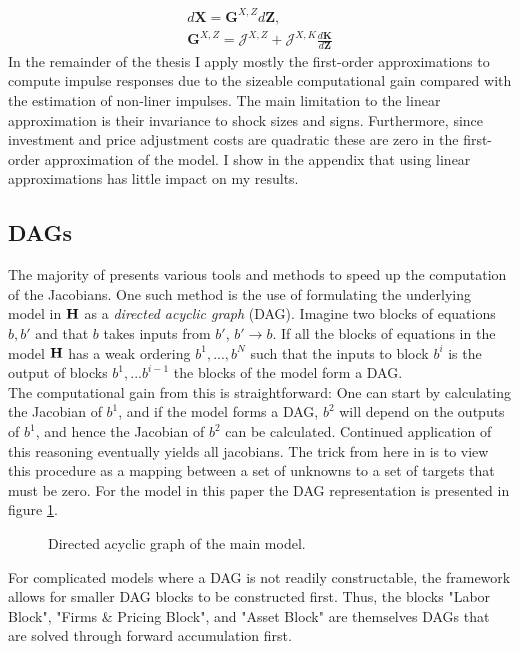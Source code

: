 \begin{gather*}
d\boldsymbol{X}=\boldsymbol{G}^{X,Z}d\boldsymbol{Z}, \\
\boldsymbol{G}^{X,Z}=\mathcal{J}^{X,Z}+\mathcal{J}^{X,K}\frac{d\boldsymbol{K}}{d\boldsymbol{Z}}
\end{gather*}
In the remainder of the thesis I apply mostly the first-order approximations to compute impulse responses due to the sizeable computational gain compared with the estimation of non-liner impulses. The main limitation to the linear approximation is their invariance to shock sizes and signs. Furthermore, since investment and price adjustment costs are quadratic these are zero in the first-order approximation of the model. I show in the appendix that using linear approximations has little impact on my results.  





\subsection{DAGs}
The majority of \citet{auclert2019using} presents various tools and methods to speed up the computation of the Jacobians. One such method is the use of formulating the underlying model in $\bold H$ as a \textit{directed acyclic graph} (DAG). Imagine two blocks of equations $b, b'$ and that $b$ takes inputs from $b'$, $b'\rightarrow b$. If all the blocks of equations in the model $\bold H$ has a weak ordering $b^1, ...,b^N$ such that the inputs to block $b^i$ is the output of blocks $b^1,...b^{i-1}$ the blocks of the model form a DAG. \\

The computational gain from this is straightforward: One can start by calculating the Jacobian of $b^1$, and if the model forms a DAG, $b^2$ will depend on the outputs of $b^1$, and hence the Jacobian of $b^2$ can be calculated. Continued application of this reasoning eventually yields all jacobians. The trick from here in \citet{auclert2019using} is to view this procedure as a mapping between a set of unknowns to a set of targets that must be zero. For the model in this paper the DAG representation is presented in figure \ref{DAG_main}.   

\begin{figure}[H]

\caption{Directed acyclic graph of the main model. } \label{DAG_main}
\end{figure}

For complicated models where a DAG is not readily constructable, the framework allows for smaller DAG blocks to be constructed first. Thus, the blocks "Labor Block", "Firms \& Pricing Block", and "Asset Block" are themselves DAGs that are solved through forward accumulation first.  






 